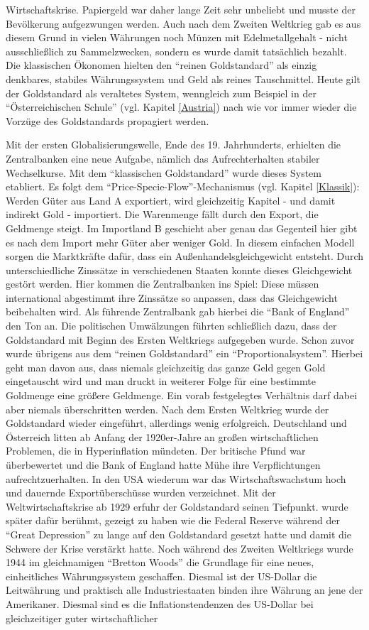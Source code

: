 Wirtschaftskrise. Papiergeld war daher lange Zeit sehr unbeliebt und musste der Bevölkerung aufgezwungen werden. Auch nach dem Zweiten Weltkrieg gab es aus diesem Grund in vielen Währungen noch Münzen mit Edelmetallgehalt - nicht ausschließlich zu Sammelzwecken, sondern es wurde damit tatsächlich bezahlt. Die klassischen Ökonomen hielten den "`reinen Goldstandard"' als einzig denkbares, stabiles Währungssystem und Geld als reines Tauschmittel. Heute gilt der Goldstandard als veraltetes System, wenngleich zum Beispiel in der "`Österreichischen Schule"' (vgl. Kapitel \ref{Austria}) nach wie vor immer wieder die Vorzüge des Goldstandards propagiert werden.  

Mit der ersten Globalisierungswelle, Ende des 19. Jahrhunderts, erhielten die Zentralbanken eine neue Aufgabe, nämlich das Aufrechterhalten stabiler Wechselkurse. Mit dem "`klassischen Goldstandard"' wurde dieses System etabliert. Es folgt dem "`Price-Specie-Flow"'-Mechanismus (vgl. Kapitel \ref{Klassik}): Werden Güter aus Land A exportiert, wird gleichzeitig Kapitel - und damit indirekt Gold - importiert. Die Warenmenge fällt durch den Export, die Geldmenge steigt. Im Importland B geschieht aber genau das Gegenteil hier gibt es nach dem Import mehr Güter aber weniger Gold. In diesem einfachen Modell sorgen die Marktkräfte dafür, dass ein Außenhandelsgleichgewicht entsteht. Durch unterschiedliche Zinssätze in verschiedenen Staaten konnte dieses Gleichgewicht gestört werden. Hier kommen die Zentralbanken ins Spiel: Diese müssen international abgestimmt ihre Zinssätze so anpassen, dass das Gleichgewicht beibehalten wird. Als führende Zentralbank gab hierbei die "`Bank of England"' den Ton an. Die politischen Umwälzungen führten schließlich dazu, dass der Goldstandard mit Beginn des Ersten Weltkriegs aufgegeben wurde. Schon zuvor wurde übrigens aus dem "`reinen Goldstandard"' ein "`Proportionalsystem"'. Hierbei geht man davon aus, dass niemals gleichzeitig das ganze Geld gegen Gold eingetauscht wird und man druckt in weiterer Folge für eine bestimmte Goldmenge eine größere Geldmenge. Ein vorab festgelegtes Verhältnis darf dabei aber niemals überschritten werden. Nach dem Ersten Weltkrieg wurde der Goldstandard wieder eingeführt, allerdings wenig erfolgreich. Deutschland und Österreich litten ab Anfang der 1920er-Jahre an großen wirtschaftlichen Problemen, die in Hyperinflation mündeten. Der britische Pfund war überbewertet und die Bank of England hatte Mühe ihre Verpflichtungen aufrechtzuerhalten. In den USA wiederum war das Wirtschaftswachstum hoch und dauernde Exportüberschüsse wurden verzeichnet. Mit der Weltwirtschaftskrise ab 1929 erfuhr der Goldstandard seinen Tiefpunkt. \textcite{Friedman1963} wurde später dafür berühmt, gezeigt zu haben wie die Federal Reserve während der "`Great Depression"' zu lange auf den Goldstandard gesetzt hatte und damit die Schwere der Krise verstärkt hatte. Noch während des Zweiten Weltkriegs wurde 1944 im gleichnamigen "`Bretton Woods"' die Grundlage für eine neues, einheitliches Währungssystem geschaffen. Diesmal ist der US-Dollar die Leitwährung und praktisch alle Industriestaaten binden ihre Währung an jene der Amerikaner. Diesmal sind es die Inflationstendenzen des US-Dollar bei gleichzeitiger guter wirtschaftlicher 
